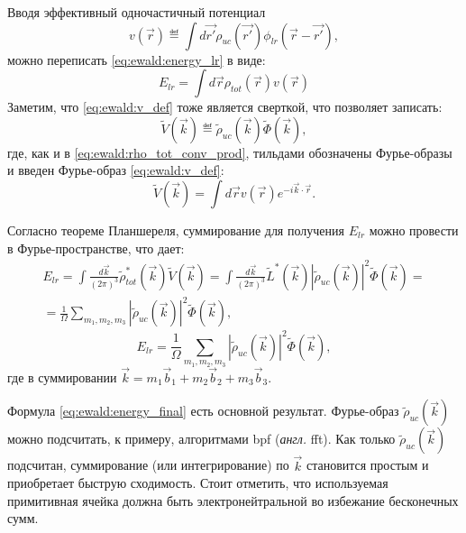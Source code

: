 Вводя эффективный одночастичный потенциал
\begin{equation}
    \label{eq:ewald:v_def}
    v(\vec{r}) \eqdef \int d \vec{r'} \rho_{u c}\left(\vec{r'}\right) \phi_{lr}\left(\vec{r}-\vec{r'}\right),
\end{equation}
можно переписать \eqref{eq:ewald:energy_lr} в виде:
\begin{equation}
    \label{eq:ewald:energy_v_rewrite}
    E_{lr}=\int d \vec{r} \rho_{tot}(\vec{r}) v(\vec{r})
\end{equation}
Заметим, что \eqref{eq:ewald:v_def} тоже является сверткой, что позволяет записать:
\begin{equation}
    \label{eq:ewald:v_fourier_conv_prod}
    \tilde{V}(\vec{k}) \eqdef \tilde{\rho}_{uc}(\vec{k}) \tilde{\Phi}(\vec{k}),
\end{equation}
где, как и в \eqref{eq:ewald:rho_tot_conv_prod}, тильдами обозначены Фурье-образы и введен Фурье-образ \eqref{eq:ewald:v_def}:
\begin{equation}
    \label{eq:ewald:v_fourier}
    \tilde{V}(\vec{k})=\int d \vec{r} v(\vec{r}) e^{-i \vec{k} \cdot \vec{r}}.
\end{equation}

Согласно теореме Планшереля, суммирование для получения $E_{lr}$ можно провести в Фурье-пространстве, что дает:
\begin{multline*}
    E_{l r} = \int \frac{d \vec{k}}{(2 \pi)^{3}} \tilde{\rho}_{tot}^{*}(\vec{k}) \tilde{V}(\vec{k})
    = \int \frac{d \vec{k}}{(2 \pi)^{3}} \tilde{L}^{*}(\vec{k})\left|\tilde{\rho}_{u c}(\vec{k})\right|^{2} \tilde{\Phi}(\vec{k}) = \\
    = \frac{1}{\Omega} \sum_{m_{1}, m_{2}, m_{3}}\left|\tilde{\rho}_{u c}(\vec{k})\right|^{2} \tilde{\Phi}(\vec{k}),
\end{multline*}
\begin{equation}
    \label{eq:ewald:energy_final}
    E_{lr} = \frac{1}{\Omega} \sum_{m_{1}, m_{2}, m_{3}}\left|\tilde{\rho}_{u c}(\vec{k})\right|^{2} \tilde{\Phi}(\vec{k}),
\end{equation}
где в суммировании $\vec{k}=m_{1} \vec{b}_{1}+m_{2} \vec{b}_{2}+m_{3} \vec{b}_{3}$.

Формула \eqref{eq:ewald:energy_final} есть основной результат.
Фурье-образ $\tilde{\rho}_{uc} (\vec{k})$ можно подсчитать, к примеру, алгоритмами \acrshort{bpf} (\textit{англ.} \acrshort{fft}).
Как только $\tilde{\rho}_{uc} (\vec{k})$ подсчитан, суммирование (или интегрирование) по $\vec{k}$ становится простым и приобретает быструю сходимость.
Стоит отметить, что используемая примитивная ячейка должна быть электронейтральной во избежание бесконечных сумм.

